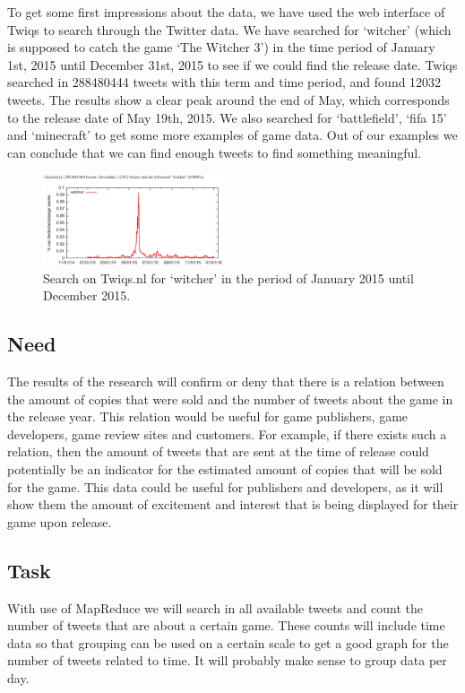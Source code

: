 To get some first impressions about the data, we have used the web interface of Twiqs to search through the Twitter data. We have searched for ‘witcher’ (which is supposed to catch the game ‘The Witcher 3’) in the time period of January 1st, 2015 until December 31st, 2015 to see if we could find the release date. Twiqs searched in 288480444 tweets with this term and time period, and found 12032 tweets. The results show a clear peak around the end of May, which corresponds to the release date of May 19th, 2015. We also searched for ‘battlefield’, ‘fifa 15’ and ‘minecraft’ to get some more examples of game data. Out of our examples we can conclude that we can find enough tweets to find something meaningful.
\begin{figure}[!ht]
	\centering
		\includegraphics[width=0.476\textwidth]{twiqswitcher}
	\caption{Search on Twiqs.nl for ‘witcher’ in the period of January 2015 until December 2015.}
\end{figure}
\subsection{Need}
The results of the research will confirm or deny that there is a relation between the amount of copies that were sold and the number of tweets about the game in the release year. This relation would be useful for game publishers, game developers, game review sites and customers. For example, if there exists such a relation, then the amount of tweets that are sent at the time of release could potentially be an indicator for the estimated amount of copies that will be sold for the game. This data could be useful for publishers and developers, as it will show them the amount of excitement and interest that is being displayed for their game upon release.
\subsection{Task}
With use of MapReduce we will search in all available tweets and count the number of tweets that are about a certain game. These counts will include time data so that grouping can be used on a certain scale to get a good graph for the number of tweets related to time. It will probably make sense to group data per day. 
